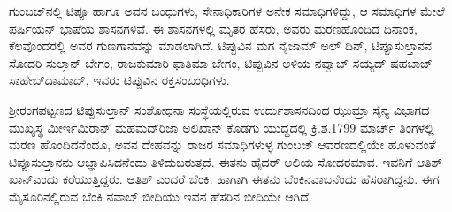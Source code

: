 ಗುಂಬಜ್​ನಲ್ಲಿ ಟಿಪ್ಪೂ ಹಾಗೂ ಅವನ ಬಂಧುಗಳು, ಸೇನಾಧಿಕಾರಿಗಳ ಅನೇಕ ಸಮಾಧಿಗಳಿದ್ದು, ಆ ಸಮಾಧಿಗಳ ಮೇಲೆ ಪರ್ಷಿಯನ್​ ಭಾಷೆಯ ಶಾಸನಗಳಿವೆ. ಈ ಶಾಸನಗಳಲ್ಲಿ ಮೃತರ ಹೆಸರು, ಅವರು ಮರಣಹೊಂದಿದ ದಿನಾಂಕ, ಕೆಲವೊಂದರಲ್ಲಿ ಅವರ ಗುಣಗಾನವನ್ನು ಮಾಡಲಾಗಿದೆ. ಟಿಪ್ಪುವಿನ ಮಗ ನೈಜಾಮ್ ಅಲ್​ ದಿನ್​, ಟಿಪ್ಪೂಸುಲ್ತಾನನ ಸೋದರಿ ಸುಲ್ತಾನ್​ ಬೇಗಂ, ರಾಜಕುಮಾರಿ ಫಾತಿಮಾ ಬೇಗಂ, ಟಿಪ್ಪುವಿನ ಅಳಿಯ ನವ್ವಾಬ್​ ಸಯ್ಯದ್​ ಷಹಬಾಜ್​ ಸಾಹೇಬ್​ ದಾಮಾದ್​, ಇವರು ಟಿಪ್ಪುವಿನ ರಕ್ತಸಂಬಂಧಿಗಳು.

ಶ‍್ರೀರಂಗಪಟ್ಟಣದ ಟಿಪ್ಪುಸುಲ್ತಾನ್​ ಸಂಶೋಧನಾ ಸಂಸ್ಥೆಯಲ್ಲಿರುವ ಉರ್ದುಶಾಸನದಿಂದ ಝುಮ್ರಾ ಸೈನ್ಯ ವಿಭಾಗದ ಮುಖ್ಯಸ್ಥ ಮೀರ್ಇಮಿರಾನ್​ ಮಹಮದ್​ರಿಜಾ ಅಲಿಖಾನ್​ ಕೊಡಗು ಯುದ್ಧದಲ್ಲಿ ಕ್ರಿ.ಶ.1799 ಮಾರ್ಚ್ ತಿಂಗಳಲ್ಲಿ ಮರಣ ಹೊಂದಿದನೆಂದೂ, ಅವನ ದೇಹವನ್ನು ರಾಜರ ಸಮಾಧಿಗಳುಳ್ಳ ಗುಂಬಜ್​ ಆವರಣದಲ್ಲಿಯೇ ಹೂಳುವಂತೆ ಟಿಪ್ಪೂಸುಲ್ತಾನನು ಆಜ್ಞಾಪಿಸಿದನೆಂದು ತಿಳಿದುಬರುತ್ತದೆ. ಈತನು ಹೈದರ್​ ಅಲಿಯ ಸೋದರಮಾವ. ಇವನಿಗೆ ಆತಿಶ್​ಖಾನ್​ ಎಂದು ಕರೆಯುತ್ತಿದ್ದರು. ಆತಿಶ್​ ಎಂದರೆ ಬೆಂಕಿ. ಹಾಗಾಗಿ ಈತನು ಬೆಂಕಿನವಾಬನೆಂದು ಹೆಸರಾಗಿದ್ದನು. ಈಗ ಮೈಸೂರಿನಲ್ಲಿರುವ ಬೆಂಕಿ ನವಾಬ್​ ಬೀದಿಯು ಇವನ ಹೆಸರಿನ ಬೀದಿಯೇ ಆಗಿದೆ. 

